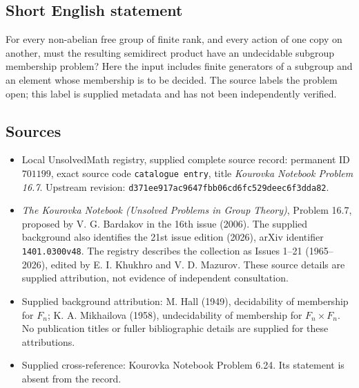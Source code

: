 \documentclass[11pt]{article}
\begin{document}
\subsection{Short English statement}
For every non-abelian free group of finite rank, and every action of one copy on another, must the resulting semidirect product have an undecidable subgroup membership problem? Here the input includes finite generators of a subgroup and an element whose membership is to be decided. The source labels the problem open; this label is supplied metadata and has not been independently verified.
\subsection{Sources}
\begin{itemize}
\item Local UnsolvedMath registry, supplied complete source record: permanent ID \(701199\), exact source code \texttt{catalogue entry}, title \emph{Kourovka Notebook Problem 16.7}. Upstream revision: \texttt{d371ee917ac9647fbb06cd6fc529deec6f3dda82}.
\item \emph{The Kourovka Notebook (Unsolved Problems in Group Theory)}, Problem 16.7, proposed by V. G. Bardakov in the 16th issue (2006). The supplied background also identifies the 21st issue edition (2026), arXiv identifier \texttt{1401.0300v48}. The registry describes the collection as Issues 1--21 (1965--2026), edited by E. I. Khukhro and V. D. Mazurov. These source details are supplied attribution, not evidence of independent consultation.
\item Supplied background attribution: M. Hall (1949), decidability of membership for \(F_n\); K. A. Mikhailova (1958), undecidability of membership for \(F_n\times F_n\). No publication titles or fuller bibliographic details are supplied for these attributions.
\item Supplied cross-reference: Kourovka Notebook Problem 6.24. Its statement is absent from the record.
\end{itemize}
\end{document}
